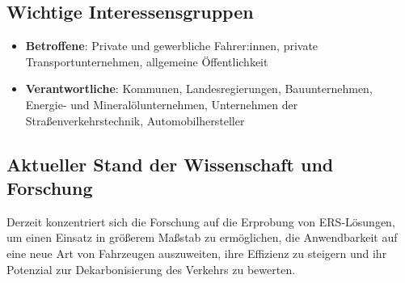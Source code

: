 \documentclass[
]{book}
\providecommand{\tightlist}{%
  \setlength{\itemsep}{0pt}\setlength{\parskip}{0pt}}
\begin{document}
\hypertarget{wichtige-interessensgruppen-3}{%
\subsection*{Wichtige Interessensgruppen}\label{wichtige-interessensgruppen-3}}

\begin{itemize}
\tightlist
\item
  \textbf{Betroffene}: Private und gewerbliche Fahrer:innen, private Transportunternehmen, allgemeine Öffentlichkeit
\item
  \textbf{Verantwortliche}: Kommunen, Landesregierungen, Bauunternehmen, Energie- und Mineralölunternehmen, Unternehmen der Straßenverkehrstechnik, Automobilhersteller
\end{itemize}

\hypertarget{aktueller-stand-der-wissenschaft-und-forschung-3}{%
\subsection*{Aktueller Stand der Wissenschaft und Forschung}\label{aktueller-stand-der-wissenschaft-und-forschung-3}}

Derzeit konzentriert sich die Forschung auf die Erprobung von ERS-Lösungen, um einen Einsatz in größerem Maßstab zu ermöglichen, die Anwendbarkeit auf eine neue Art von Fahrzeugen auszuweiten, ihre Effizienz zu steigern und ihr Potenzial zur Dekarbonisierung des Verkehrs zu bewerten.
\end{document}
